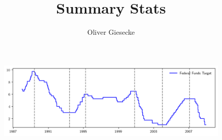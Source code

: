 \documentclass{article}
\begin{document}
\title{Summary Stats}
\author{Oliver Giesecke}


\maketitle 

\begin{table}[h!]
	\begin{center}
		
	\end{center}
\end{table}

\begin{table}[h!]
	\begin{center}
		
	\end{center}
\end{table}



\begin{table}[h!]
	\begin{center}
		
	\end{center}
\end{table}

\begin{landscape}
\begin{table}[h!]
	\begin{center}
		
	\end{center}
\end{table}
\end{landscape}

\clearpage

\begin{landscape}

		\begin{figure}[!htp]
		\begin{center}
	\includegraphics[scale=.95]{../../output/fig_fed_target.png}
		\end{center}
	\end{figure}
	
	\begin{table}[!htp]
		\begin{center}
			
		\end{center}
	\end{table}
\end{landscape}
\end{document}
